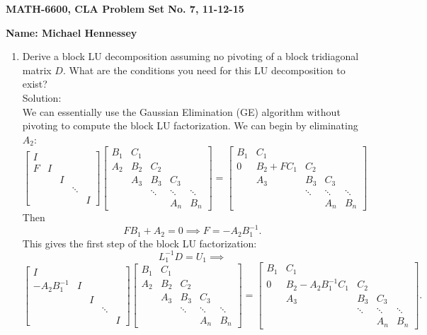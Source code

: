 \documentclass[12pt]{article}
\numberwithin{equation}{section}
\newcommand{\A}{\mathcal{A}}
\begin{document}
{\large\bf MATH-6600, CLA Problem Set No. 7, 11-12-15}



\vspace{6 ex}

{\bf Name: Michael Hennessey} \hfill

\vspace{6 ex}

\begin{enumerate}
\item Derive a block LU decomposition assuming no pivoting of a block tridiagonal matrix $D$. What are the conditions you need for this LU decomposition to exist?\\

Solution:\\

We can essentially use the Gaussian Elimination (GE) algorithm without pivoting to compute the block LU factorization. We can begin by eliminating $A_2$:
$$\left[\begin{array}{ccccc}I&&&&\\F&I&&&\\&&I&&\\&&&\ddots&\\&&&&I\end{array}\right]\left[\begin{array}{ccccc}B_1&C_1&&&\\A_2&B_2&C_2&&\\&A_3&B_3&C_3&\\&&\ddots&\ddots&\ddots\\&&&A_n&B_n\end{array}\right]=\left[\begin{array}{ccccc}B_1&C_1&&&\\0&B_2+FC_1&C_2&&\\&A_3&B_3&C_3&\\&&\ddots&\ddots&\ddots\\&&&A_n&B_n\end{array}\right]$$
Then
$$FB_1+A_2=0\implies F=-A_2B_1^{-1}.$$
This gives the first step of the block LU factorization:
$$L_1^{-1}D=U_1\implies$$
$$\left[\begin{array}{ccccc}I&&&&\\-A_2B_1^{-1}&I&&&\\&&I&&\\&&&\ddots&\\&&&&I\end{array}\right]\left[\begin{array}{ccccc}B_1&C_1&&&\\A_2&B_2&C_2&&\\&A_3&B_3&C_3&\\&&\ddots&\ddots&\ddots\\&&&A_n&B_n\end{array}\right]=\left[\begin{array}{ccccc}B_1&C_1&&&\\0&B_2-A_2B_1^{-1}C_1&C_2&&\\&A_3&B_3&C_3&\\&&\ddots&\ddots&\ddots\\&&&A_n&B_n\end{array}\right].$$


\end{enumerate}
\end{document}
